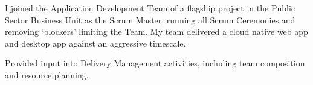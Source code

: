 I joined the Application Development Team of a flagship project in the Public Sector Business Unit as the Scrum Master, running all Scrum Ceremonies and removing `blockers' limiting the Team.
My team delivered a cloud native web app and desktop app against an aggressive timescale.
\vspace{0.25em}
\begin{tightemize}
  \item Provided input into Delivery Management activities, including team composition and resource planning.
\end{tightemize}
\sectionsep{}
\vfill{}
